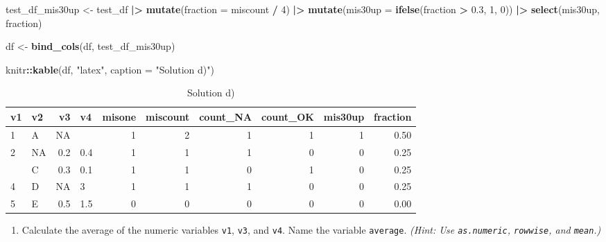 \documentclass[
  doc]{apa6}
\newenvironment{Shaded}{\begin{snugshade}}{\end{snugshade}}
\newcommand{\AttributeTok}[1]{\textcolor[rgb]{0.13,0.29,0.53}{#1}}
\newcommand{\DecValTok}[1]{\textcolor[rgb]{0.00,0.00,0.81}{#1}}
\newcommand{\FloatTok}[1]{\textcolor[rgb]{0.00,0.00,0.81}{#1}}
\newcommand{\FunctionTok}[1]{\textcolor[rgb]{0.13,0.29,0.53}{\textbf{#1}}}
\newcommand{\NormalTok}[1]{#1}
\newcommand{\OtherTok}[1]{\textcolor[rgb]{0.56,0.35,0.01}{#1}}
\newcommand{\SpecialCharTok}[1]{\textcolor[rgb]{0.81,0.36,0.00}{\textbf{#1}}}
\newcommand{\StringTok}[1]{\textcolor[rgb]{0.31,0.60,0.02}{#1}}
\providecommand{\tightlist}{%
  \setlength{\itemsep}{0pt}\setlength{\parskip}{0pt}}
\begin{document}
\newpage

\begin{Shaded}
\begin{Highlighting}[]
\NormalTok{test\_df\_mis30up }\OtherTok{\textless{}{-}}\NormalTok{ test\_df }\SpecialCharTok{|\textgreater{}} 
  \FunctionTok{mutate}\NormalTok{(}\AttributeTok{fraction =}\NormalTok{ miscount }\SpecialCharTok{/} \DecValTok{4}\NormalTok{) }\SpecialCharTok{|\textgreater{}} 
  \FunctionTok{mutate}\NormalTok{(}\AttributeTok{mis30up =} \FunctionTok{ifelse}\NormalTok{(fraction }\SpecialCharTok{\textgreater{}} \FloatTok{0.3}\NormalTok{, }\DecValTok{1}\NormalTok{, }\DecValTok{0}\NormalTok{)) }\SpecialCharTok{|\textgreater{}} 
  \FunctionTok{select}\NormalTok{(mis30up, fraction)}
  
\NormalTok{df }\OtherTok{\textless{}{-}} \FunctionTok{bind\_cols}\NormalTok{(df, test\_df\_mis30up)}

\NormalTok{knitr}\SpecialCharTok{::}\FunctionTok{kable}\NormalTok{(df, }\StringTok{"latex"}\NormalTok{, }\AttributeTok{caption =} \StringTok{"Solution d)"}\NormalTok{)}
\end{Highlighting}
\end{Shaded}

\begin{table}

\caption{\label{tab:unnamed-chunk-5}Solution d)}
\centering
\begin{tabular}[t]{l|l|r|l|r|r|r|r|r|r}
\hline
v1 & v2 & v3 & v4 & misone & miscount & count\_NA & count\_OK & mis30up & fraction\\
\hline
1 & A & NA &  & 1 & 2 & 1 & 1 & 1 & 0.50\\
\hline
2 & NA & 0.2 & 0.4 & 1 & 1 & 1 & 0 & 0 & 0.25\\
\hline
 & C & 0.3 & 0.1 & 1 & 1 & 0 & 1 & 0 & 0.25\\
\hline
4 & D & NA & 3 & 1 & 1 & 1 & 0 & 0 & 0.25\\
\hline
5 & E & 0.5 & 1.5 & 0 & 0 & 0 & 0 & 0 & 0.00\\
\hline
\end{tabular}
\end{table}

\newpage

\begin{enumerate}
\def\labelenumi{\alph{enumi})}
\setcounter{enumi}{4}
\tightlist
\item
  Calculate the average of the numeric variables \texttt{v1}, \texttt{v3}, and \texttt{v4}. Name the variable \texttt{average}.
  \emph{(Hint: Use \texttt{as.numeric}, \texttt{rowwise}, and \texttt{mean}.)}
\end{enumerate}
\end{document}
